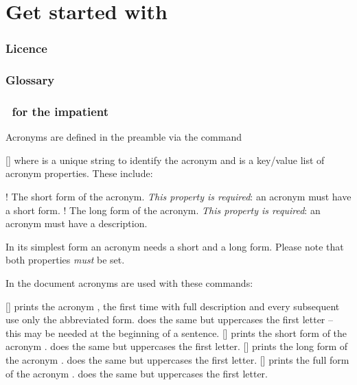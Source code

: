 \documentclass{acro-manual}
\begin{document}
\clearpage
\part{Get started with \acro}\label{part:get-started-with}

\section{Licence}\label{sec:licence}
\license

\section{Glossary}
\printacronyms[include=glossary,template=glossary]

\section{\acro\ for the impatient}\label{sec:acro-impatient}

Acronyms are defined in the preamble via the command
\begin{commands}
  []
    where  is a unique string to identify the acronym and
     is a key\slash value list of acronym properties.  These
    include:
\end{commands}
\begin{properties}
  \Initial!
    The short form of the acronym.  \emph{This property is required}: an
    acronym must have a short form.
  \Initial!
    The long form of the acronym.  \emph{This property is required}: an
    acronym must have a description.
\end{properties}
\begin{bewareofthedog}
  In its simplest form an acronym needs a short and a long form.  Please note
  that both properties \emph{must} be set.
\end{bewareofthedog}  

In the document acronyms are used with these commands:
\begin{commands}
  [\quad{}]
     prints the acronym , the first time with full description
    and every subsequent use only the abbreviated form.  does the same
    but uppercases the first letter -- this may be needed at the beginning of
    a sentence.
  [\quad{}]
     prints the short form of the acronym .  does the
    same but uppercases the first letter.
  [\quad{}]
     prints the long form of the acronym .  does the
    same but uppercases the first letter.
  [\quad{}]
     prints the full form of the acronym .  does the
    same but uppercases the first letter.
\end{commands}
\end{document}
